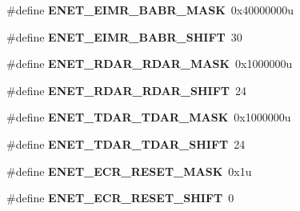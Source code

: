 \begin{DoxyCompactItemize}
\item 
\hypertarget{group___e_n_e_t___register___masks_ga58e5d69da07a75b36ef7d5fe01b5275d}{}\#define {\bfseries E\+N\+E\+T\+\_\+\+E\+I\+M\+R\+\_\+\+B\+A\+B\+R\+\_\+\+M\+A\+S\+K}~0x40000000u\label{group___e_n_e_t___register___masks_ga58e5d69da07a75b36ef7d5fe01b5275d}

\item 
\hypertarget{group___e_n_e_t___register___masks_ga21dfb3f07aa8f8591b954d3a3e91cd81}{}\#define {\bfseries E\+N\+E\+T\+\_\+\+E\+I\+M\+R\+\_\+\+B\+A\+B\+R\+\_\+\+S\+H\+I\+F\+T}~30\label{group___e_n_e_t___register___masks_ga21dfb3f07aa8f8591b954d3a3e91cd81}

\item 
\hypertarget{group___e_n_e_t___register___masks_gaf4ddad52a6258f0e5958ab67f26a5a00}{}\#define {\bfseries E\+N\+E\+T\+\_\+\+R\+D\+A\+R\+\_\+\+R\+D\+A\+R\+\_\+\+M\+A\+S\+K}~0x1000000u\label{group___e_n_e_t___register___masks_gaf4ddad52a6258f0e5958ab67f26a5a00}

\item 
\hypertarget{group___e_n_e_t___register___masks_ga6f04308372016c60e2cb80485451e9d9}{}\#define {\bfseries E\+N\+E\+T\+\_\+\+R\+D\+A\+R\+\_\+\+R\+D\+A\+R\+\_\+\+S\+H\+I\+F\+T}~24\label{group___e_n_e_t___register___masks_ga6f04308372016c60e2cb80485451e9d9}

\item 
\hypertarget{group___e_n_e_t___register___masks_ga5758f935dabab51a86c68161bce5be1b}{}\#define {\bfseries E\+N\+E\+T\+\_\+\+T\+D\+A\+R\+\_\+\+T\+D\+A\+R\+\_\+\+M\+A\+S\+K}~0x1000000u\label{group___e_n_e_t___register___masks_ga5758f935dabab51a86c68161bce5be1b}

\item 
\hypertarget{group___e_n_e_t___register___masks_gae2d1ffef71e20daf95833ce26619b212}{}\#define {\bfseries E\+N\+E\+T\+\_\+\+T\+D\+A\+R\+\_\+\+T\+D\+A\+R\+\_\+\+S\+H\+I\+F\+T}~24\label{group___e_n_e_t___register___masks_gae2d1ffef71e20daf95833ce26619b212}

\item 
\hypertarget{group___e_n_e_t___register___masks_ga3b154308b2f4ab59eb5e0bed4f38cb70}{}\#define {\bfseries E\+N\+E\+T\+\_\+\+E\+C\+R\+\_\+\+R\+E\+S\+E\+T\+\_\+\+M\+A\+S\+K}~0x1u\label{group___e_n_e_t___register___masks_ga3b154308b2f4ab59eb5e0bed4f38cb70}

\item 
\hypertarget{group___e_n_e_t___register___masks_ga717ccaad52747f6a8be4eae66d95d178}{}\#define {\bfseries E\+N\+E\+T\+\_\+\+E\+C\+R\+\_\+\+R\+E\+S\+E\+T\+\_\+\+S\+H\+I\+F\+T}~0\label{group___e_n_e_t___register___masks_ga717ccaad52747f6a8be4eae66d95d178}


\end{DoxyCompactItemize}
